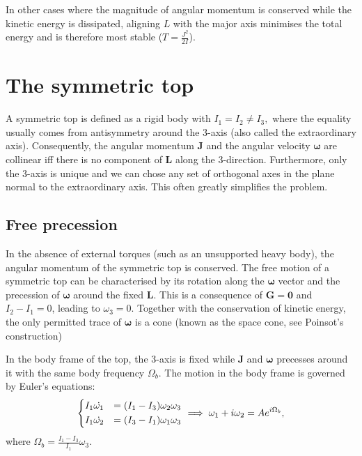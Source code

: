 \documentclass{article}
\begin{document}
In other cases where the magnitude of angular momentum is conserved while the kinetic energy is dissipated, aligning $L$ with the major axis minimises the total energy and is therefore most stable ($T = \frac{J^2}{2I}$). 

\section{The symmetric top}
A symmetric top is defined as a rigid body with $I_1 = I_2 \neq I_3,$ where the equality usually comes from antisymmetry around the 3-axis (also called the extraordinary axis). Consequently, the angular momentum $\mathbf{J} $ and the angular velocity $\boldsymbol{\mathbf{\omega}} $ are collinear iff there is no component of $\mathbf{L}$ along the 3-direction. Furthermore, only the 3-axis is unique and we can chose any set of orthogonal axes in the plane normal to the extraordinary axis. This often greatly simplifies the problem. 

\subsection{Free precession}
In the absence of external torques (such as an unsupported heavy body), the angular momentum of the symmetric top is conserved. The free motion of a symmetric top can be characterised by its rotation along the $\boldsymbol{\mathbf{\omega}}$ vector and the precession of $\boldsymbol{\mathbf{\omega}}$ around the fixed $\mathbf{L} $. This is a consequence of $\mathbf{G} = \textbf{0} $ and $I_2 - I_1 = 0$, leading to $\omega_3 = 0$. Together with the conservation of kinetic energy, the only permitted trace of $\boldsymbol{\mathbf{\omega}}$ is a cone (known as the space cone, see Poinsot's construction)

In the body frame of the top, the 3-axis is fixed while $\mathbf{J}$ and $\boldsymbol{\mathbf{\omega}}$ precesses around it with the same body frequency $\Omega_b.$ The motion in the body frame is governed by Euler's equations:
\[
    \begin{dcases}
        I_1 \dot{\omega_1} &= (I_1 - I_3) \omega_2 \omega_3   \\
        I_1 \dot{\omega_2} &= (I_3 - I_1) \omega_1 \omega_3
    \end{dcases}
    \implies 
    \omega_1 + i \omega_2 = A e^{i \Omega_b},
\]
where $\boxed{\Omega_b = \frac{I_1 - I_3}{I_1}\omega_3}. $
\end{document}
